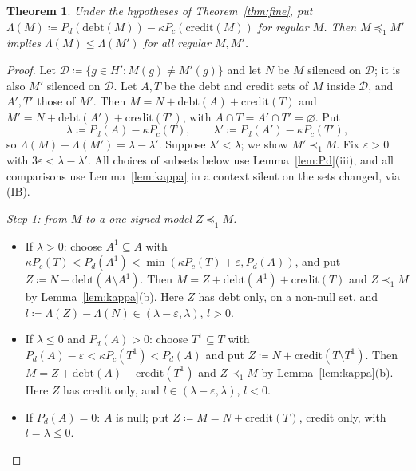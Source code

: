 \documentclass[11pt]{article}
\newtheorem{theorem}{Theorem}
\theoremstyle{definition}\newtheorem{definition}[theorem]{Definition}
\theoremstyle{remark}\newtheorem{remark}[theorem]{Remark}
\newcommand{\debt}{\mathrm{debt}}
\newcommand{\cred}{\mathrm{credit}}
\begin{document}
\begin{theorem}\label{thm:extension}
Under the hypotheses of Theorem~\ref{thm:fine}, put
$\Lambda(M)\coloneqq P_d(\debt(M))-\kappa P_c(\cred(M))$ for regular $M$.
Then $M\preceq_1M'$ implies $\Lambda(M)\le\Lambda(M')$ for all regular
$M,M'$.
\end{theorem}
\begin{proof}
Let $\mathcal D\coloneqq\{g\in H':M(g)\ne M'(g)\}$ and let $N$ be $M$
silenced on $\mathcal D$; it is also $M'$ silenced on $\mathcal D$. Let $A,T$
be the debt and credit sets of $M$ inside $\mathcal D$, and $A',T'$ those of
$M'$. Then $M=N+\debt(A)+\cred(T)$ and $M'=N+\debt(A')+\cred(T')$, with
$A\cap T=A'\cap T'=\varnothing$. Put
\[
 \lambda\coloneqq P_d(A)-\kappa P_c(T),\qquad
 \lambda'\coloneqq P_d(A')-\kappa P_c(T'),
\]
so $\Lambda(M)-\Lambda(M')=\lambda-\lambda'$. Suppose $\lambda'<\lambda$; we
show $M'\prec_1M$. Fix $\varepsilon>0$ with $3\varepsilon<\lambda-\lambda'$.
All choices of subsets below use Lemma~\ref{lem:Pd}(iii), and all comparisons
use Lemma~\ref{lem:kappa} in a context silent on the sets changed, via (IB).

\emph{Step 1: from $M$ to a one-signed model $Z\preceq_1M$.}
\begin{itemize}[leftmargin=*,itemsep=1pt]
\item If $\lambda>0$: choose $A^1\subseteq A$ with
$\kappa P_c(T)<P_d(A^1)<\min(\kappa P_c(T)+\varepsilon,P_d(A))$, and put
$Z\coloneqq N+\debt(A\setminus A^1)$. Then $M=Z+\debt(A^1)+\cred(T)$ and
$Z\prec_1M$ by Lemma~\ref{lem:kappa}(b). Here $Z$ has debt only, on a
non-null set, and $l\coloneqq\Lambda(Z)-\Lambda(N)\in(\lambda-\varepsilon,
\lambda)$, $l>0$.
\item If $\lambda\le0$ and $P_d(A)>0$: choose $T^1\subseteq T$ with
$P_d(A)-\varepsilon<\kappa P_c(T^1)<P_d(A)$ and put
$Z\coloneqq N+\cred(T\setminus T^1)$. Then $M=Z+\debt(A)+\cred(T^1)$ and
$Z\prec_1M$ by Lemma~\ref{lem:kappa}(b). Here $Z$ has credit only, and
$l\in(\lambda-\varepsilon,\lambda)$, $l<0$.
\item If $P_d(A)=0$: $A$ is null; put $Z\coloneqq M=N+\cred(T)$, credit
only, with $l=\lambda\le0$.
\end{itemize}


\end{proof}
\end{document}
